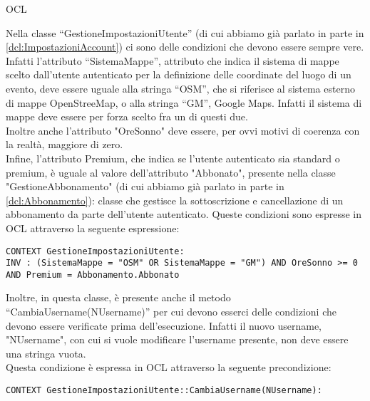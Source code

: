 \begin{listaPersonale}{OCL}
    \begin{center}
        
    \end{center}
    Nella classe “GestioneImpostazioniUtente” (di cui abbiamo già parlato in parte in \ref{dcl:ImpostazioniAccount}) ci sono delle condizioni che devono essere sempre vere. Infatti l'attributo “SistemaMappe”, attributo che indica il sistema di mappe scelto dall'utente autenticato per la definizione delle coordinate del luogo di un evento, deve essere uguale alla stringa “OSM”, che si riferisce al sistema esterno di mappe OpenStreeMap, o alla stringa “GM”, Google Maps. Infatti il sistema di mappe deve essere per forza scelto fra un di questi due. \\
    Inoltre anche l'attributo "OreSonno" deve essere, per ovvi motivi di coerenza con la realtà, maggiore di zero. \\
    Infine, l'attributo Premium, che indica se l'utente autenticato sia standard o premium, è uguale al valore dell'attributo "Abbonato", presente nella classe "GestioneAbbonamento" (di cui abbiamo già parlato in parte in \ref{dcl:Abbonamento}): classe che gestisce la sottoscrizione e cancellazione di un abbonamento da parte dell'utente autenticato.
    Queste condizioni sono espresse in OCL attraverso la seguente espressione:
    \begin{lstlisting}
CONTEXT GestioneImpostazioniUtente:
INV : (SistemaMappe = "OSM" OR SistemaMappe = "GM") AND OreSonno >= 0 AND Premium = Abbonamento.Abbonato
    \end{lstlisting}
    Inoltre, in questa classe, è presente anche il metodo “CambiaUsername(NUsername)” per cui devono esserci delle condizioni che devono essere verificate prima dell'esecuzione. Infatti il nuovo username, "NUsername", con cui si vuole modificare l'username presente, non deve essere una stringa vuota. \\
    Questa condizione è espressa in OCL attraverso la seguente precondizione:
    \begin{lstlisting}
CONTEXT GestioneImpostazioniUtente::CambiaUsername(NUsername):

\end{lstlisting}
\end{listaPersonale}
